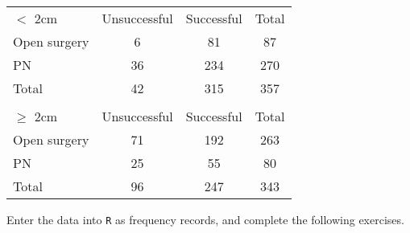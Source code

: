 \documentclass[letterpaper,9pt,twoside,printwatermark=false]{pinp}
\begin{document}
\begin{table}[h]
    \centering
    \begin{tabular}{lcc|c}
        $<$ 2cm & Unsuccessful &  Successful & Total\\
        Open surgery & 6 & 81 & 87 \\
        PN           & 36 & 234 & 270 \\
        \hline
        Total   & 42 & 315 & 357 \\
        & & &  \\
                $\geq$ 2cm & Unsuccessful &  Successful & Total\\
        Open surgery & 71 & 192 & 263 \\
        PN           & 25 & 55 & 80 \\
        \hline
        Total       & 96 & 247 & 343
    \end{tabular}
\end{table}

Enter the data into \texttt{R} as frequency records, and complete the
following exercises.
\end{document}

